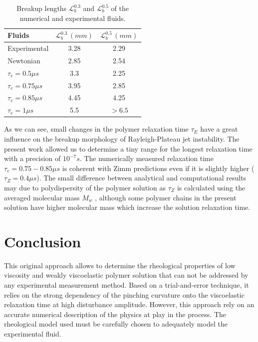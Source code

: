 \documentclass[twocolumn,10pt]{asme2ej}
\begin{document}
\begin{table}[H]
    \begin{center}
        \begin{tabular}{l|cc}
            Fluids & $\mathcal{L}^{0.3}_b\,(mm)$ &$\mathcal{L}^{0.5}_b\,(mm)$\\
            \hline
            Experimental  & 3.28  &2.29 \\
            Newtonian & 2.85 & 2.54\\ 
            $\tau_e = 0.5\mu s$ & 3.3 & 2.25\\ 
            $\tau_e = 0.75\mu s$ & 3.95 & 2.85\\ 
            $\tau_e = 0.85\mu s$ & 4.45 & 4.25\\ 
            $\tau_e = 1\mu s$ & 5.5 & $> 6.5$\\ 
            \hline
        \end{tabular}
    \end{center}
    \label{tab:lbInk}
    \caption{Breakup lengths $\mathcal{L}^{0.3}_b$ and $\mathcal{L}^{0.5}_b$ of the numerical and experimental fluids.}
\end{table}


As we can see, small changes in the polymer relaxation time $\tau_E$ have a great influence on the breakup morphology of Rayleigh-Plateau jet instability. The present work allowed us to determine a tiny range for the longest relaxation time with a precision of $10^{-7} s$. The numerically measured relaxation time $\tau_e = 0.75-0.85 \mu s$ is coherent with Zimm predictions even if it is slightly higher ($\tau_Z = 0.4 \mu s$).  The small difference between analytical and computational results may due to polydispersity of the polymer solution as $\tau_Z$ is calculated using the averaged molecular mass $M_w$ , although some
polymer chains in the present solution have higher molecular mass which increase the solution relaxation time.

\section{Conclusion}
This original approach allows to determine the rheological properties of low viscosity and weakly viscoelastic polymer solution that can not be addressed by any experimental measurement method. Based on a trial-and-error technique, it relies on the strong dependency of the pinching curvature onto the viscoelastic relaxation time at high disturbance amplitude. However, this approach rely on an accurate numerical description of the physics at play in the process. The rheological model used must be carefully chosen to adequately model the experimental fluid.
\end{document}
